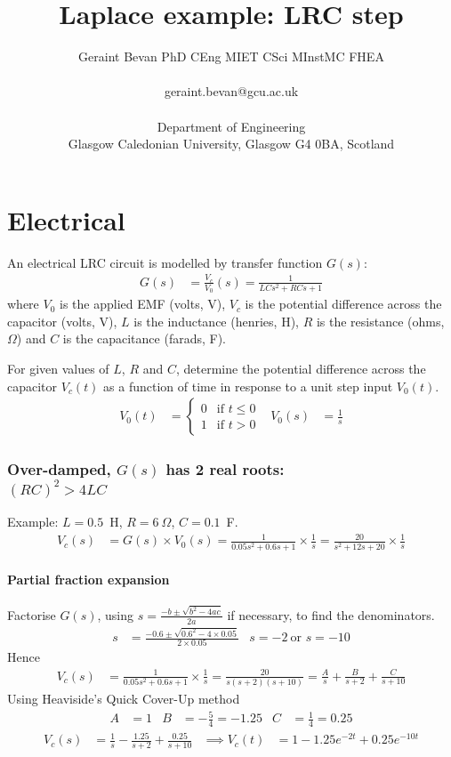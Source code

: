 \documentclass[a4paper,12pt]{article}
\title{Laplace example: LRC step}
\author{Geraint Bevan
  {\small
    PhD CEng MIET CSci MInstMC FHEA}
  \\\ \\
  geraint.bevan@gcu.ac.uk
  \\\ \\
  Department of Engineering\\
  Glasgow Caledonian University,
  Glasgow G4 0BA, Scotland}
\begin{document}
\maketitle

\part{Electrical}
An electrical LRC circuit is modelled by transfer function $G(s)$:
\begin{align*}
  G(s) &= \frac{V_c}{V_{0}}(s) = \frac{1}{L C s^2 + R C s + 1}
\end{align*}
where $V_0$ is the applied EMF (volts, V), $V_c$ is the potential difference across the capacitor (volts, V),
$L$ is the inductance (henries, H), $R$ is the resistance (ohms, $\Omega$) and $C$ is the capacitance (farads, F).

For given values of $L$, $R$ and $C$, determine the potential difference across the capacitor $V_c(t)$ as a function of time in response to a unit step input $V_0(t)$.
\begin{align*}
  V_0(t) &= \begin{cases} 0 & \text{if } t \leq 0 \\ 1 & \text{if } t > 0 \end{cases} &
  V_0(s) &= \frac{1}{s}
\end{align*}

\newpage
\section*{Over-damped, $G(s)$ has 2 real roots:\\ $(RC)^2>4LC $}
Example: $L=0.5$~H, $R=6~\Omega$, $C=0.1$~F. %
\begin{align*}
  V_c(s) &= G(s) \times V_0(s)
  = \frac{1}{0.05 s^2 + 0.6 s + 1} \times \frac{1}{s}
  = \frac{20}{s^2 + 12 s + 20} \times \frac{1}{s}
\end{align*}

\subsection*{Partial fraction expansion}
Factorise $G(s)$, using $s = \frac{-b\pm\sqrt{b^2-4ac}}{2a}$ if necessary, to find the denominators.
\begin{align*}
  s &= \frac{-0.6\pm\sqrt{0.6^2-4\times 0.05}}{2\times 0.05} & s=-2~\text{or }s=-10
\end{align*}
Hence
\begin{align*}
  V_c(s) &=\frac{1}{0.05 s^2 + 0.6 s + 1} \times \frac{1}{s}
  = \frac{20}{s(s+2)(s+10)}
  = \frac{A}{s} + \frac{B}{s+2} + \frac{C}{s+10}
\end{align*}
Using Heaviside's Quick Cover-Up method
\begin{align*}
  A &= 1 & B &= -\frac{5}{4} = -1.25 & C &= \frac{1}{4} = 0.25
\end{align*}
\begin{align*}
  V_c(s) &= \frac{1}{s} - \frac{1.25}{s+2} + \frac{0.25}{s+10} &\implies
  V_c(t) &= 1 - 1.25 e^{-2t} + 0.25 e^{-10t}
\end{align*}
\end{document}
